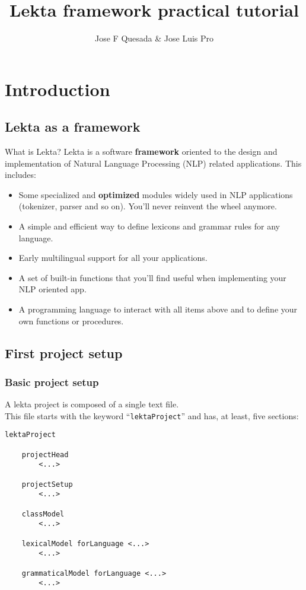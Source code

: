 \documentclass[11pt]{beamer}
\title[Lekta framework practical tutorial]{Lekta framework practical tutorial}
\author{Jose F Quesada \& Jose Luis Pro}
\date{}
\begin{document}
\begin{frame}
\titlepage
\end{frame}

\section{Introduction}

\subsection{Lekta as a framework}

\begin{frame}
	\begin{block}{What is Lekta?}
			Lekta is a software \textbf{framework} oriented to the design and implementation of Natural Language Processing (NLP) related applications. This includes:
			\pause
			\begin{itemize}
				\item Some specialized and \textbf{optimized} modules widely used in NLP applications (tokenizer, parser and so on). You'll never reinvent the wheel anymore.
				\pause
				\item A simple and efficient way to define lexicons and grammar rules for any language.
				\pause
				\item Early multilingual support for all your applications.
				\pause
				\item A set of built-in functions that you'll find useful when implementing your NLP oriented app.
				\pause
				\item A programming language to interact with all items above and to define your own functions or procedures.
			\end{itemize}
	\end{block}
\end{frame}

\subsection{First project setup}

\begin{frame}[fragile]
\frametitle{Basic project setup}
A lekta project is composed of a single text file.\\
\vspace{5pt}
\pause
This file starts with the keyword ``\texttt{lektaProject}'' and has, at least, five sections:
\vspace{5pt}
\pause
\scriptsize
\begin{lstlisting}[language=lekta]
lektaProject

	projectHead
		<...>

	projectSetup
		<...>
		
	classModel
		<...>

	lexicalModel forLanguage <...>
		<...>
		
	grammaticalModel forLanguage <...>
		<...>

\end{lstlisting}
\end{frame}
\end{document}
